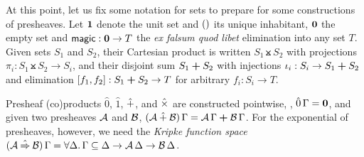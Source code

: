 \documentclass[sigplan,screen,fleqn]{acmart}
\begin{document}
At this point, let us fix some notation for sets to prepare for some
constructions of presheaves.  Let $\mbox{\textbf{1}}$ denote the unit set and
$()$ its unique inhabitant, $\mbox{\textbf{0}}$ the empty set and
$\mathsf{magic} : \mbox{\textbf{0}} \to T$ the \emph{ex falsum quod libet} elimination
into any set $T$.  Given sets $S_1$ and $S_2$, their Cartesian product
is written $S_1 \btimes S_2$ with projections $\pi_i : S_1 \btimes S_2
\to S_i$, and their disjoint sum $S_1 \boldsymbol{+} S_2$ with injections
$\iota_i : S_i \to S_1 \boldsymbol{+} S_2$ and elimination $[f_1,f_2] : S_1 \boldsymbol{+}
S_2 \to T$ for arbitrary $f_i : S_i \to T$.

Presheaf (co)products $\hat0$, $\hat1$, $\mathbin{\hat+}$, and $\mathbin{\hat\times}$ are
constructed pointwise, \eg, $\hat0\,\Gamma = \mbox{\textbf{0}}$, and given two
presheaves $\mathcal{A}$ and $\mathcal{B}$,
$(\mathcal{A} \mathbin{\hat+} \mathcal{B})\,\Gamma = \mathcal{A}\,\Gamma \boldsymbol{+} \mathcal{B}\,\Gamma$.  For the
exponential of presheaves, however, we need the \emph{Kripke function
  space}
$(\A \hatto \B)\,\Gamma = \forall \Delta.\, \Gamma \sublist \Delta
\to \A\,\Delta \to \B\,\Delta$.
\end{document}
